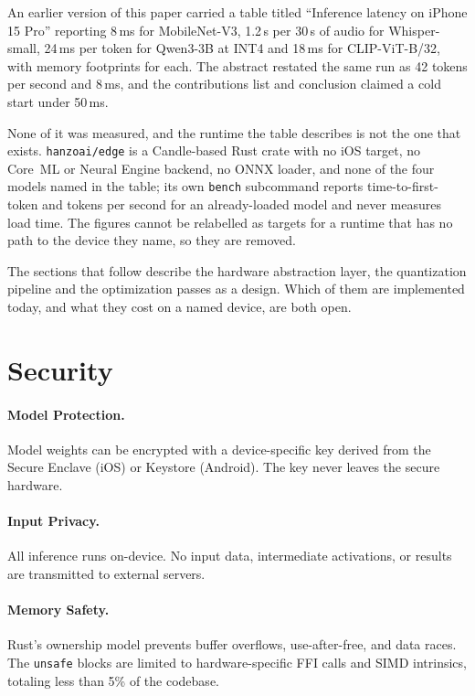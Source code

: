 \documentclass[11pt,twocolumn]{article}
\begin{document}
An earlier version of this paper carried a table titled ``Inference latency on
iPhone 15 Pro'' reporting 8\,ms for MobileNet-V3, 1.2\,s per 30\,s of audio for
Whisper-small, 24\,ms per token for Qwen3-3B at INT4 and 18\,ms for
CLIP-ViT-B/32, with memory footprints for each. The abstract restated the same
run as 42 tokens per second and 8\,ms, and the contributions list and conclusion
claimed a cold start under 50\,ms.

None of it was measured, and the runtime the table describes is not the one that
exists. \texttt{hanzoai/edge} is a Candle-based Rust crate with no iOS target,
no Core~ML or Neural Engine backend, no ONNX loader, and none of the four models
named in the table; its own \texttt{bench} subcommand reports time-to-first-token
and tokens per second for an already-loaded model and never measures load time.
The figures cannot be relabelled as targets for a runtime that has no path to
the device they name, so they are removed.

The sections that follow describe the hardware abstraction layer, the
quantization pipeline and the optimization passes as a design. Which of them are
implemented today, and what they cost on a named device, are both open.

\section{Security}

\paragraph{Model Protection.} Model weights can be encrypted with a device-specific key derived from the Secure Enclave (iOS) or Keystore (Android). The key never leaves the secure hardware.

\paragraph{Input Privacy.} All inference runs on-device. No input data, intermediate activations, or results are transmitted to external servers.

\paragraph{Memory Safety.} Rust's ownership model prevents buffer overflows, use-after-free, and data races. The \texttt{unsafe} blocks are limited to hardware-specific FFI calls and SIMD intrinsics, totaling less than 5\% of the codebase.
\end{document}
